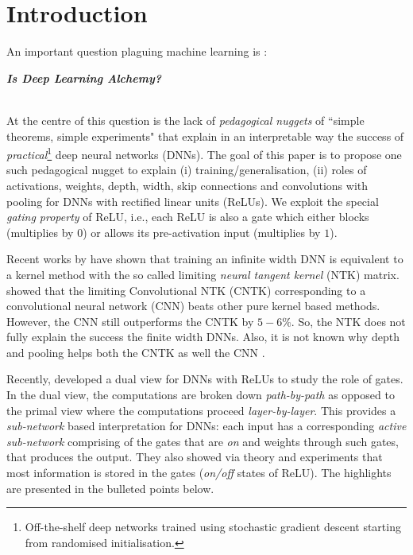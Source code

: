 \section{Introduction}\label{sec:intro}
An important question plaguing machine learning is \citet{BenAli-1,Lecun,BenAli-2,Aliresponse,Mickens}:\\
{\centerline{\textbf{\emph{Is Deep Learning Alchemy?}}}}\\
At the centre of this question is the lack of \emph{pedagogical nuggets} of ``simple theorems, simple experiments" \cite{Aliresponse} that explain in an interpretable way the success of \emph{practical}\footnote{Off-the-shelf deep networks trained using stochastic gradient descent starting from randomised initialisation.} deep neural networks (DNNs). The goal of this paper is to propose one such pedagogical nugget to explain (i) training/generalisation, (ii) roles of activations, weights, depth, width, skip connections and convolutions with pooling for DNNs with rectified linear units (ReLUs). We exploit the special \emph{gating property} of ReLU, i.e., each ReLU is also a gate which either blocks (multiplies by $0$) or allows its pre-activation input (multiplies by $1$). 

Recent works by \citet{arora2019exact, ntk,cao2019generalization} have shown that training an infinite width DNN is equivalent to a kernel method with the so called limiting \emph{neural tangent kernel} (NTK) matrix. \citet{arora2019exact} showed that the limiting Convolutional NTK (CNTK) corresponding to a convolutional neural network (CNN) beats other pure kernel based methods. However, the CNN still outperforms the CNTK by $5-6\%$. So, the NTK does not fully explain the success the finite width DNNs. Also, it is not known why depth and pooling helps both the CNTK as well the CNN \cite{arora2019exact}.

Recently, \citet{npk} developed a dual view for DNNs with ReLUs to study the role of gates. In the dual view, the computations are broken down \emph{path-by-path} as opposed to the primal view where the computations proceed \emph{layer-by-layer}. This provides a \emph{sub-network} based interpretation for DNNs: each input has a corresponding \emph{active sub-network} comprising of the gates that are \emph{on} and weights through such gates, that produces the output. They also showed via theory and experiments that most information is stored in the gates (\emph{on/off} states of ReLU). The highlights are presented in the bulleted points below.

